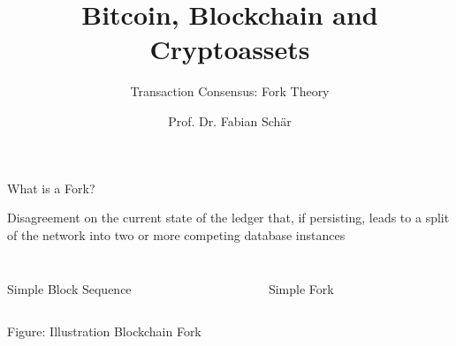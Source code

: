 \documentclass[handout]{beamer}
\title{Bitcoin, Blockchain and Cryptoassets}
\subtitle{Transaction Consensus: Fork Theory}
\author{Prof. Dr. Fabian Schär}
\institute{University of Basel}
\begin{document}
\thispagestyle{empty}
\begin{frame}[noframenumbering]
	\titlepage
\end{frame}


\begin{frame}{What is a Fork?}

\color{focus} Disagreement on the current state \color{black} of the ledger that, if persisting, leads to a \color{focus} split of the network \color{black}  into two or more competing database instances

\begin{columns}[T]
	\begin{column}{0.45\textwidth}
		\begin{figure}[h]
  			\center
  			\resizebox{0.9\textwidth}{!}{
			
			}
		\end{figure}
	\end{column}
	\begin{column}{0.45\textwidth}
		\begin{figure}[h]
  			\center
  			\resizebox{0.9\textwidth}{!}{
			
			}
		\end{figure}
	\end{column}
\end{columns}

\begin{columns}[T]
	\begin{column}{0.45\textwidth}
		\center		
		\footnotesize Simple Block Sequence
	\end{column}
	\begin{column}{0.45\textwidth}
		\center
 		\footnotesize Simple Fork 
	\end{column}
\end{columns}
\begin{center}
Figure: Illustration Blockchain Fork \cite{schar2020blockchain}
\end{center}


\end{frame}
\end{document}
